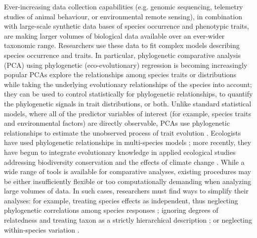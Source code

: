 \documentclass[12pt]{article}
\begin{document}
Ever-increasing data collection capabilities (e.g. genomic sequencing, telemetry studies of animal behaviour, or environmental remote sensing), in combination with large-scale synthetic data bases of species occurrence and phenotypic traits, are making larger volumes of biological data available over an ever-wider taxonomic range.
Researchers use these data to fit complex models describing species occurrence and traits.
In particular, phylogenetic comparative analysis (PCA) using phylogenetic (eco-evolutionary) regression \citep{hansen2012interpreting} is
becoming increasingly popular %
PCAs explore the relationships among species traits or distributions while taking the underlying evolutionary relationships of the species into account; they can be used to control statistically for phylogenetic relationships, to quantify the phylogenetic signals in trait distributions, or both.
Unlike standard statistical models, where all of the predictor variables of interest (for example, species traits and environmental factors) are directly observable,  PCAs use phylogenetic relationships to estimate the unobserved process of trait evolution \citep{felsenstein1985phylogenies, butler2004phylogenetic}. 
Ecologists have used phylogenetic relationships in multi-species models \citep{garland1992procedures, freckleton2002phylogenetic, ord2010adaptation, davies2013phylogenetic}; more recently, they have begun to integrate evolutionary knowledge in applied ecological studies addressing biodiversity conservation and the effects of climate change \citep{winter2013phylogenetic, santamaria2012evolution, lankau2011incorporating, lavergne2010biodiversity, mace2008evolutionary}.
While a wide range of tools is available for comparative analyses, existing procedures may be either insufficiently flexible or too computationally demanding when analyzing large volumes of data.
In such cases, researchers must find ways to simplify their analyses: for example, treating species effects as independent, thus neglecting phylogenetic correlations among species responses \citep{bunnefeld2012island}; ignoring degrees of relatedness and treating taxon as a strictly hierarchical description \citep{tella1999habitat}; or neglecting within-species variation \citep{ord2010adaptation}.
\end{document}
